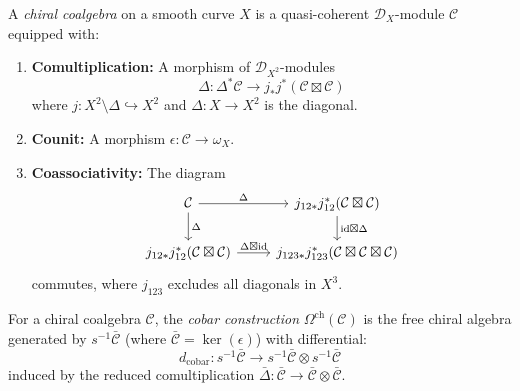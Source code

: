 \begin{definition}\label{def:chiral}
A \emph{chiral coalgebra} on a smooth curve $X$ is a quasi-coherent $\mathcal{D}_X$-module $\mathcal{C}$ equipped with:
\begin{enumerate}
\item \textbf{Comultiplication:} A morphism of $\mathcal{D}_{X^2}$-modules
\[
\Delta: \Delta^*\mathcal{C} \to j_*j^*(\mathcal{C} \boxtimes \mathcal{C})
\]
where $j: X^2 \setminus \Delta \hookrightarrow X^2$ and $\Delta: X \to X^2$ is the diagonal.

\item \textbf{Counit:} A morphism $\epsilon: \mathcal{C} \to \omega_X$.

\item \textbf{Coassociativity:} The diagram
\[
\begin{tikzcd}
\mathcal{C} \arrow[r, "\Delta"] \arrow[d, "\Delta"] & j_{12*}j_{12}^*(\mathcal{C} \boxtimes \mathcal{C}) \arrow[d, "\text{id} \boxtimes \Delta"] \\
j_{12*}j_{12}^*(\mathcal{C} \boxtimes \mathcal{C}) \arrow[r, "\Delta \boxtimes \text{id}"] & j_{123*}j_{123}^*(\mathcal{C} \boxtimes \mathcal{C} \boxtimes \mathcal{C})
\end{tikzcd}
\]
commutes, where $j_{123}$ excludes all diagonals in $X^3$.
\end{enumerate}
\end{definition}

\begin{definition}\label{def:cobar}
For a chiral coalgebra $\mathcal{C}$, the \emph{cobar construction} $\Omega^{\text{ch}}(\mathcal{C})$ is the free chiral algebra generated by $s^{-1}\bar{\mathcal{C}}$ (where $\bar{\mathcal{C}} = \ker(\epsilon)$) with differential:
\[
d_{\text{cobar}}: s^{-1}\bar{\mathcal{C}} \to s^{-1}\bar{\mathcal{C}} \otimes s^{-1}\bar{\mathcal{C}}
\]
induced by the reduced comultiplication $\bar{\Delta}: \bar{\mathcal{C}} \to \bar{\mathcal{C}} \otimes \bar{\mathcal{C}}$.
\end{definition}

